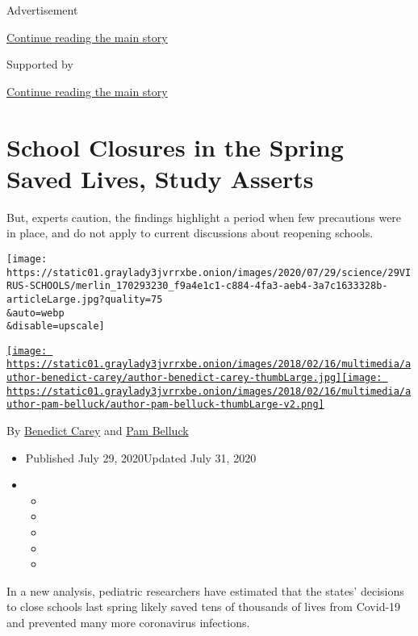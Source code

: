 Advertisement

\protect\hyperlink{after-top}{Continue reading the main story}

Supported by

\protect\hyperlink{after-sponsor}{Continue reading the main story}

\hypertarget{school-closures-in-the-spring-saved-lives-study-asserts}{%
\section{School Closures in the Spring Saved Lives, Study
Asserts}\label{school-closures-in-the-spring-saved-lives-study-asserts}}

But, experts caution, the findings highlight a period when few
precautions were in place, and do not apply to current discussions about
reopening schools.

\texttt{[image: https://static01.graylady3jvrrxbe.onion/images/2020/07/29/science/29VIRUS-SCHOOLS/merlin\_170293230\_f9a4e1c1-c884-4fa3-aeb4-3a7c1633328b-articleLarge.jpg?quality=75\\\&auto=webp\\\&disable=upscale]}

\href{https://www.nytimes3xbfgragh.onion/by/benedict-carey}{\texttt{[image: https://static01.graylady3jvrrxbe.onion/images/2018/02/16/multimedia/author-benedict-carey/author-benedict-carey-thumbLarge.jpg]}}\href{https://www.nytimes3xbfgragh.onion/by/pam-belluck}{\texttt{[image: https://static01.graylady3jvrrxbe.onion/images/2018/02/16/multimedia/author-pam-belluck/author-pam-belluck-thumbLarge-v2.png]}}

By \href{https://www.nytimes3xbfgragh.onion/by/benedict-carey}{Benedict
Carey} and \href{https://www.nytimes3xbfgragh.onion/by/pam-belluck}{Pam
Belluck}

\begin{itemize}
\item
  Published July 29, 2020Updated July 31, 2020
\item
  \begin{itemize}
  \item
  \item
  \item
  \item
  \item
  \end{itemize}
\end{itemize}

In a new analysis, pediatric researchers have estimated that the states'
decisions to close schools last spring likely saved tens of thousands of
lives from Covid-19 and prevented many more coronavirus infections.

